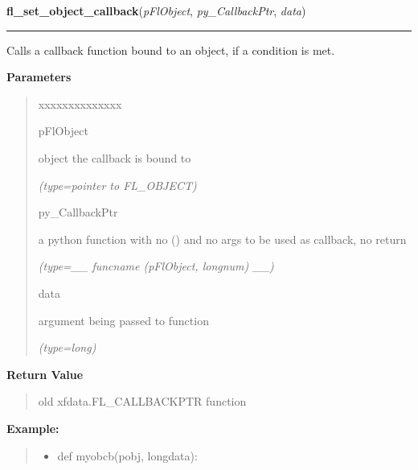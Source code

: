 \hspace{.8\funcindent}\begin{boxedminipage}{\funcwidth}

    \raggedright \textbf{fl\_set\_object\_callback}(\textit{pFlObject}, \textit{py\_CallbackPtr}, \textit{data})

    \vspace{-1.5ex}

    \rule{\textwidth}{0.5\fboxrule}
\setlength{\parskip}{2ex}
    Calls a callback function bound to an object, if a condition is met.

\setlength{\parskip}{1ex}
      \textbf{Parameters}
      \vspace{-1ex}

      \begin{quote}
        \begin{Ventry}{xxxxxxxxxxxxxx}

          \item[pFlObject]

          object the callback is bound to

            {\it (type=pointer to FL\_OBJECT)}

          \item[py\_CallbackPtr]

          a python function with no () and no args to be used as callback, 
          no return

            {\it (type=\_\_ funcname (pFlObject, longnum) \_\_)}

          \item[data]

          argument being passed to function

            {\it (type=long)}

        \end{Ventry}

      \end{quote}

      \textbf{Return Value}
    \vspace{-1ex}

      \begin{quote}
      old xfdata.FL\_CALLBACKPTR function

      \end{quote}

\textbf{Example:}
\begin{quote}
  \begin{itemize}

  \item
    \setlength{\parskip}{0.6ex}
def myobcb(pobj, longdata):




\end{itemize}
\end{quote}
\end{boxedminipage}
